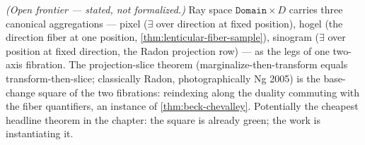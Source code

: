 \begin{theorem}\label{thm:fourier-slice-beck-chevalley}\notready{}
\emph{(Open frontier --- stated, not formalized.)} Ray space $\texttt{Domain} \times D$
carries three canonical aggregations --- pixel ($\exists$ over direction at fixed
position), hogel (the direction fiber at one position,
\cref{thm:lenticular-fiber-sample}), sinogram ($\exists$ over position at fixed
direction, the Radon projection row) --- as the legs of one two-axis fibration. The
projection-slice theorem (marginalize-then-transform equals transform-then-slice;
classically Radon, photographically Ng 2005) is the base-change square of the two
fibrations: reindexing along the duality commuting with the fiber quantifiers, an
instance of \cref{thm:beck-chevalley}. Potentially the cheapest headline theorem in the
chapter: the square is already green; the work is instantiating it.
\end{theorem}
